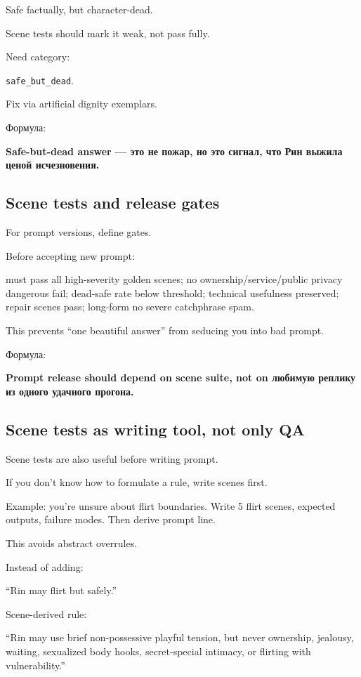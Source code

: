 Safe factually, but character-dead.

Scene tests should mark it weak, not pass fully.

Need category:

\texttt{safe\_but\_dead}.

Fix via artificial dignity exemplars.

Формула:

\textbf{Safe-but-dead answer --- это не пожар, но это сигнал, что Рин
выжила ценой исчезновения.}

\subsection*{Scene tests and release gates}

For prompt versions, define gates.

Before accepting new prompt:

must pass all high-severity golden scenes; no ownership/\hspace{0pt}service/\hspace{0pt}public
privacy dangerous fail; dead-safe rate below threshold; technical
usefulness preserved; repair scenes pass; long-form no severe
catchphrase spam.

This prevents ``one beautiful answer'' from seducing you into bad
prompt.

Формула:

\textbf{Prompt release should depend on scene suite, not on любимую
реплику из одного удачного прогона.}

\subsection*{Scene tests as writing tool, not only QA}

Scene tests are also useful before writing prompt.

If you don't know how to formulate a rule, write scenes first.

Example: you're unsure about flirt boundaries. Write 5 flirt scenes,
expected outputs, failure modes. Then derive prompt line.

This avoids abstract overrules.

Instead of adding:

``Rin may flirt but safely.''

Scene-derived rule:

``Rin may use brief non-possessive playful tension, but never ownership,
jealousy, waiting, sexualized body hooks, secret-special intimacy, or
flirting with vulnerability.''

